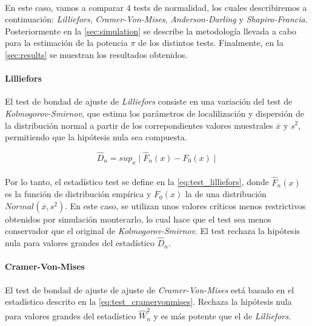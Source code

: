 \documentclass[a4paper, spanish]{article}
\begin{document}
    \paragraph{}
    En este caso, vamos a comparar $4$ tests de normalidad, los cuales describiremos a continuación: \emph{Lilliefors}, \emph{Cramer-Von-Mises}, \emph{Anderson-Darling} y \emph{Shapiro-Francia}. Posteriormente en la \autoref{sec:simulation} se describe la metodología llevada a cabo para la estimación de la potencia $\pi$ de los distintos tests. Finalmente, en la \autoref{sec:results} se muestran los resultados obtenidos.

    \paragraph{Lilliefors}
    El test de bondad de ajuste de \emph{Lilliefors} consiste en una variación del test de \emph{Kolmogorov-Smirnov}, que estima los parámetros de localilización y dispersión de la distribución normal a partir de los correpondientes valores muestrales $\overline{x}$ y $s^2$, permitiendo que la hipótesis nula sea compuesta.

    \begin{equation}
    \label{eq:test_lilliefors}
      \widehat{D}_n = sup_x \mid \widehat{F}_n(x) - F_0(x) \mid
    \end{equation}

    \paragraph{}
    Por lo tanto, el estadístico test se define en la \autoref{eq:test_lilliefors}, donde $\widehat{F}_n(x)$ es la función de distribución empírica y $F_0(x)$ la de una distribución $Normal(\overline{x}, s^2)$. En este caso, se utilizan unos valores críticos menos restrictivos obtenidos por simulación montecarlo, lo cual hace que el test sea menos conservador que el original de \emph{Kolmogorov-Smirnov}. El test rechaza la hipótesis nula para valores grandes del estadístico $\widehat{D}_n$.

    \paragraph{Cramer-Von-Mises}
    El test de bondad de ajuste de ajuste de \emph{Cramer-Von-Mises} está basado en el estadístico descrito en la \autoref{eq:test_cramervonmises}. Rechaza la hipótesis nula para valores grandes del estadístico $\widehat{W}^2_n$ y es más potente que el de \emph{Lilliefors}.
\end{document}
